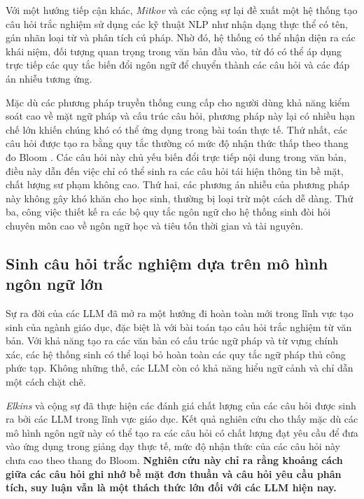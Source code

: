 Với một hướng tiếp cận khác, \textit{Mitkov} và các cộng sự \cite{mitkov2006computer} lại đề xuất một hệ thống tạo câu hỏi trắc nghiệm sử dụng các kỹ thuật NLP như nhận dạng thực thể có tên, gán nhãn loại từ và phân tích cú pháp. Nhờ đó, hệ thống có thể nhận diện ra các khái niệm, đối tượng quan trọng trong văn bản đầu vào, từ đó có thể áp dụng trực tiếp các quy tắc biến đổi ngôn ngữ để chuyển thành các câu hỏi và các đáp án nhiễu tương ứng.

Mặc dù các phương pháp truyền thống cung cấp cho người dùng khả năng kiểm soát cao về mặt ngữ pháp và cấu trúc câu hỏi, phương pháp này lại có nhiều hạn chế lớn khiến chúng khó có thể ứng dụng trong bài toán thực tế. Thứ nhất, các câu hỏi được tạo ra bằng quy tắc thường có mức độ nhận thức thấp theo thang đo Bloom \cite{bloom1956taxonomy}. Các câu hỏi này chủ yếu biến đổi trực tiếp nội dung trong văn bản, điều này dẫn đến việc chỉ có thể sinh ra các câu hỏi tái hiện thông tin bề mặt, chất lượng sư phạm không cao. Thứ hai, các phương án nhiễu của phương pháp này không gây khó khăn cho học sinh, thường bị loại trừ một cách dễ dàng. Thứ ba, công việc thiết kế ra các bộ quy tắc ngôn ngữ cho hệ thống sinh đòi hỏi chuyên môn cao về ngôn ngữ học và tiêu tốn thời gian và tài nguyên.

\subsection{Sinh câu hỏi trắc nghiệm dựa trên mô hình ngôn ngữ lớn}

Sự ra đời của các LLM đã mở ra một hướng đi hoàn toàn mới trong lĩnh vực tạo sinh của ngành giáo dục, đặc biệt là với bài toán tạo câu hỏi trắc nghiệm từ văn bản. Với khả năng tạo ra các văn bản có cấu trúc ngữ pháp và từ vựng chính xác, các hệ thống sinh có thể loại bỏ hoàn toàn các quy tắc ngữ pháp thủ công phức tạp. Không những thế, các LLM còn có khả năng hiểu ngữ cảnh và chỉ dẫn một cách chặt chẽ.

\textit{Elkins} và cộng sự \cite{elkins2023useful} đã thực hiện các đánh giá chất lượng của các câu hỏi được sinh ra bởi các LLM trong lĩnh vực giáo dục. Kết quả nghiên cứu cho thấy mặc dù các mô hình ngôn ngữ này có thể tạo ra các câu hỏi có chất lượng đạt yêu cầu để đưa vào ứng dụng trong giảng dạy thực tế, mức độ nhận thức của các câu hỏi này chưa cao theo thang đo Bloom. \textbf{Nghiên cứu này chỉ ra rằng khoảng cách giữa các câu hỏi ghi nhớ bề mặt đơn thuần và câu hỏi yêu cầu phân tích, suy luận vẫn là một thách thức lớn đối với các LLM hiện nay.}

